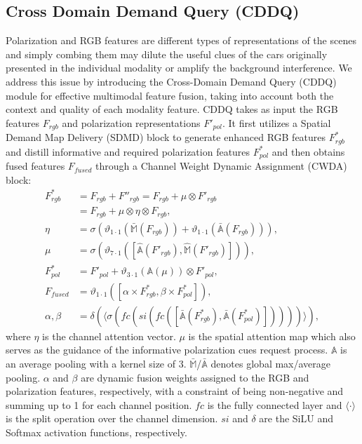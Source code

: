 \subsection{Cross Domain Demand Query (CDDQ)}
Polarization and RGB features are different types of representations of the scenes and simply combing them may dilute the useful clues of the cars originally presented in the individual modality or amplify the background interference. We address this issue by introducing the Cross-Domain Demand Query (CDDQ) module for effective multimodal feature fusion, taking into account both the context and quality of each modality feature. CDDQ takes as input the RGB features $F_{rgb}$ and polarization representations $F'_{pol}$. It first utilizes a Spatial Demand Map Delivery (SDMD) block to generate enhanced RGB features $F_{rgb}^{*}$ and distill informative and required polarization features $F_{pol}^{*}$ and then obtains fused features $F_{fused}$ through a Channel Weight Dynamic Assignment (CWDA) block:
\allowdisplaybreaks\begin{align}
    F_{rgb}^{*} &=F_{rgb}+F''_{rgb} = F_{rgb}+\mu\otimes F'_{rgb} \nonumber \\
        &=F_{rgb}+\mu\otimes \eta\otimes F_{rgb}, \\
    \eta &=\sigma(\vartheta_{1\cdot1}(\bar{\mathbb{M}}(F_{rgb}))+\vartheta_{1\cdot1}(\bar{\mathbb{A}}(F_{rgb}))), \\
    \mu &=\sigma(\vartheta_{7\cdot1}([\hat{\mathbb{A}}(F'_{rgb}), \hat{\mathbb{M}}(F'_{rgb})])), \\
    F_{pol}^{*} &=F'_{pol}+\vartheta_{3\cdot1}(\mathbb{A}(\mu))\otimes F'_{pol}, \\
    F_{fused} &=\vartheta_{1\cdot1}([\alpha\times F_{rgb}^{*},\beta\times F_{pol}^{*}]), \\
    \alpha, \beta &=\delta(\langle\sigma(fc(si(fc([\bar{\mathbb{A}}(F_{rgb}^{*}), \bar{\mathbb{A}}(F_{pol}^{*})]))))\rangle),
\end{align}
where $\eta$ is the channel attention vector. $\mu$ is the spatial attention map which also serves as the guidance of the informative polarization cues request process. $\mathbb{A}$ is an average pooling with a kernel size of 3. $\bar{\mathbb{M}}$/$\bar{\mathbb{A}}$ denotes global max/average pooling. $\alpha$ and $\beta$ are dynamic fusion weights assigned to the RGB and polarization features, respectively, with a constraint of being non-negative and summing up to 1 for each channel position. $fc$ is the fully connected layer and $\langle\cdot\rangle$ is the split operation over the channel dimension. $si$ and $\delta$ are the SiLU and Softmax activation functions, respectively.

